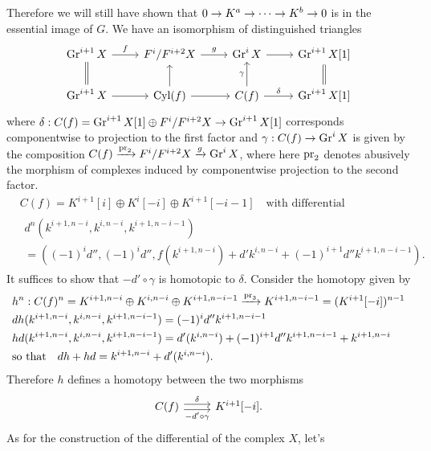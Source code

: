 \documentclass[deligne.tex]{subfiles}
\begin{document}
Therefore we will still have shown that $0\rightarrow K^a\rightarrow\cdots\rightarrow K^b\rightarrow0$ is
in the essential image of $G$.
We have an isomorphism of distinguished triangles
\begin{equation*}\begin{tikzcd}
	\Gr^{i+1}X\arrow[r,"f"]
	&F^i/F^{i+2}X\arrow[r,"g"]
	&\Gr^iX\arrow[r]
	&\Gr^{i+1}X[1] \\
	\Gr^{i+1}X\arrow[r]\arrow[u,equals]
	&\operatorname{Cyl}(f)\arrow[u]\arrow[r]
	&C(f)\arrow[u,"\gamma"]\arrow[r,"\delta"]
	&\Gr^{i+1}X[1]\arrow[u,equals]
\end{tikzcd}\end{equation*}
where $\delta:C(f)=\operatorname{Gr}^{i+1}X[1]\oplus F^i/F^{i+2}X\rightarrow \operatorname{Gr}^{i+1}X[1]$
corresponds componentwise to projection to the first factor and
$\gamma:C(f)\rightarrow\operatorname{Gr}^iX$ is given by the composition
$C(f)\xrightarrow{\operatorname{pr}_2}F^i/F^{i+2}X\xrightarrow g\operatorname{Gr}^iX$, where here $\operatorname{pr}_2$ denotes
abusively the morphism of complexes induced by componentwise projection 
to the second factor.
\begin{align*}
	&C(f)=K^{i+1}[i]\oplus K^i[-i]\oplus K^{i+1}[-i-1]
	\quad\text{with differential} \\
	&\begin{multlined}d^n(k^{i+1,n-i},k^{i,n-i},k^{i+1,n-i-1}) \\
	=((-1)^id'',(-1)^id'',f(k^{i+1,n-i})+d'k^{i,n-i}+(-1)^{i+1}d''k^{i+1,n-i-1}).\end{multlined}
\end{align*}
It suffices to show that $-d'\circ\gamma$ is homotopic to $\delta$.
Consider the homotopy given by
\begin{align*}
	&h^n:C(f)^n=K^{i+1,n-i}\oplus K^{i,n-i}\oplus K^{i+1,n-i-1}
	\xrightarrow{\operatorname{pr}_3} K^{i+1,n-i-1}=(K^{i+1}[-i])^{n-1} \\
	&dh(k^{i+1,n-i},k^{i,n-i},k^{i+1,n-i-1})
	=(-1)^id''k^{i+1,n-i-1} \\
	&hd(k^{i+1,n-i},k^{i,n-i},k^{i+1,n-i-1})
	=d'(k^{i,n-i})+(-1)^{i+1}d''k^{i+1,n-i-1}+k^{i+1,n-i} \\
	&\text{so that}\quad
	dh+hd=k^{i+1,n-i}+d'(k^{i,n-i}).
\end{align*}
Therefore $h$ defines a homotopy between the two morphisms
\begin{equation*}\begin{tikzcd}
	C(f)\arrow[r,shift left,"\delta"]\arrow[r,shift right,"-d'\circ\gamma"']
	&K^{i+1}[-i].
\end{tikzcd}\end{equation*}
As for the construction of the differential of the complex $X$, let's
\end{document}
